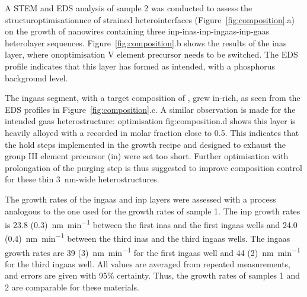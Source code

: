 A STEM and EDS analysis of sample 2 was conducted to assess the structuroptimisationnce of strained heterointerfaces (Figure~\ref{fig:composition}.a) on the growth of nanowires containing three \acs{inp}-\acs{inas}-\acs{inp}-\acs{ingaas}-\acs{inp}-\acs{gaas} heterolayer sequences. Figure~\ref{fig:composition}.b shows the results of the \acs{inas} layer, where onoptimisation V element precursor needs to be switched. The EDS profile indicates that this layer has formed as intended, with a phosphorus background level. 
\par
The \acs{ingaas} segment, with a target composition of , grew \acs{in}-rich, as seen from the EDS profiles in Figure~\ref{fig:composition}.c. A similar observation is made for the intended \acs{gaas} heterostructure: optimisation {fig:composition}.d shows this layer is heavily alloyed with a recorded \acs{in} molar fraction close to \num{0.5}. This indicates that the hold steps implemented in the growth recipe and designed to exhaust the group III element precursor (\acs{in}) were set too short. Further optimisation with prolongation of the purging step is thus suggested to improve composition control for these thin \qty{3}{nm}-wide heterostructures.
\par
The growth rates of the \acs{ingaas} and \acs{inp} layers were assessed with a process analogous to the one used for the growth rates of sample 1. The \acs{inp} growth rates is \qty[separate-uncertainty=true]{23.8 (0.3)}{\nano\metre\per\minute} between the first \acs{inas} and the first \acs{ingaas} wells and \qty[separate-uncertainty=true]{24.0 (0.4)}{\nano\metre\per\minute} between the third \acs{inas} and the third \acs{ingaas} wells. The \acs{ingaas} growth rates are \qty[separate-uncertainty=true]{39 (3)}{\nano\metre\per\minute} for the first \acs{ingaas} well and \qty[separate-uncertainty=true]{44 (2)}{\nano\metre\per\minute} for the third \acs{ingaas} well. All values are averaged from repeated measurements, and errors are given with 95\% certainty. Thus, the growth rates of samples 1 and 2 are comparable for these materials.



